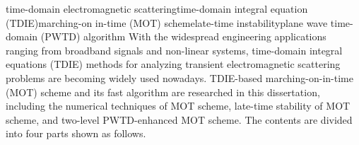 \addtocounter{page}{-1}
\begin{Eabstract}{time-domain electromagnetic scattering}{time-domain integral equation
(TDIE)}{marching-on in-time (MOT) scheme}{late-time instability}{plane
wave time-domain (PWTD) algorithm}
With the widespread engineering applications ranging from broadband signals and
non-linear systems, time-domain integral equations (TDIE) methods for analyzing
transient electromagnetic scattering problems are becoming widely used nowadays.
TDIE-based marching-on-in-time (MOT) scheme and its fast algorithm are researched
in this dissertation, including the numerical techniques of MOT scheme, late-time
stability of MOT scheme, and two-level PWTD-enhanced MOT scheme. The contents
are divided into four parts shown as follows.
\end{Eabstract}

